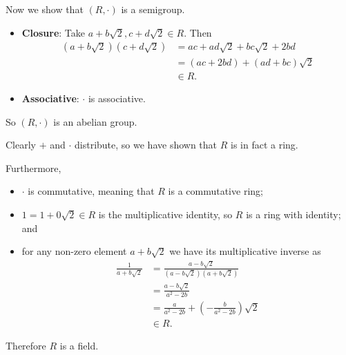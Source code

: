 \begin{questions}
    Now we show that $(R, \cdot)$ is a semigroup.
    \begin{itemize}
        \item \textbf{Closure}: Take $a+b\sqrt2, c+d\sqrt2 \in R$. Then
        \begin{align*}
            (a+b\sqrt2)(c+d\sqrt2) &= ac + ad\sqrt2 + bc\sqrt2 + 2bd\\
            &= (ac+2bd) + (ad+bc)\sqrt2\\
            &\in R.
        \end{align*}
        \item \textbf{Associative}: $\cdot$ is associative.
    \end{itemize}
    So $(R, \cdot)$ is an abelian group.

    Clearly $+$ and $\cdot$ distribute, so we have shown that $R$ is in fact a ring.

    Furthermore,
    \begin{itemize}
        \item $\cdot$ is commutative, meaning that $R$ is a commutative ring;
        \item $1 = 1 + 0\sqrt2 \in R$ is the multiplicative identity, so $R$ is a ring with identity; and
        \item for any non-zero element $a+b\sqrt2$ we have its multiplicative inverse as
        \begin{align*}
            \frac{1}{a+b\sqrt2} &= \frac{a-b\sqrt2}{(a-b\sqrt2)(a+b\sqrt2)}\\
            &= \frac{a-b\sqrt2}{a^2-2b}\\
            &= \frac{a}{a^2-2b} + \left(-\frac{b}{a^2-2b}\right)\sqrt2\\
            &\in R.
        \end{align*}
    \end{itemize}
    Therefore $R$ is a field.


\end{questions}

